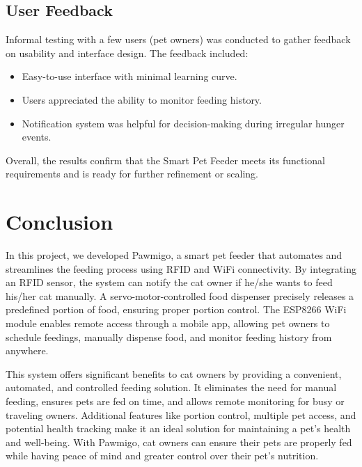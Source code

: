 \documentclass[10pt,a4paper]{extarticle}
\begin{document}
\subsection{User Feedback}

Informal testing with a few users (pet owners) was conducted to gather feedback on usability and interface design. The feedback included:

\begin{itemize}[parsep=0em]
    \item Easy-to-use interface with minimal learning curve.
    \item Users appreciated the ability to monitor feeding history.
    \item Notification system was helpful for decision-making during irregular hunger events.
\end{itemize}

Overall, the results confirm that the Smart Pet Feeder meets its functional requirements and is ready for further refinement or scaling.

\newpage

\section{Conclusion}
In this project, we developed Pawmigo, a smart pet feeder that automates and streamlines the feeding process using RFID and WiFi connectivity. By integrating an RFID sensor, the system can notify the cat owner if he/she wants to feed his/her cat manually. A servo-motor-controlled food dispenser precisely releases a predefined portion of food, ensuring proper portion control. The ESP8266 WiFi module enables remote access through a mobile app, allowing pet owners to schedule feedings, manually dispense food, and monitor feeding history from anywhere.

This system offers significant benefits to cat owners by providing a convenient, automated, and controlled feeding solution. It eliminates the need for manual feeding, ensures pets are fed on time, and allows remote monitoring for busy or traveling owners. Additional features like portion control, multiple pet access, and potential health tracking make it an ideal solution for maintaining a pet's health and well-being. With Pawmigo, cat owners can ensure their pets are properly fed while having peace of mind and greater control over their pet's nutrition.
\end{document}
